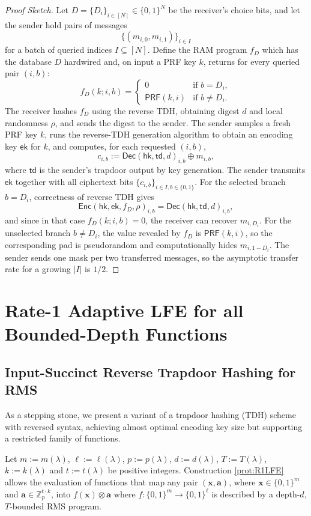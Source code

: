 \documentclass{article}
\newcommand{\Z}{\mathbb{Z}}
\renewcommand{\sec}{\ensuremath{\lambda}}
\newcommand{\algofont}[1]{\ensuremath{\mathsf{#1}}}
\newcommand{\Enc}{{\algofont{Enc}}}
\newcommand{\Dec}{{\algofont{Dec}}}
\begin{document}
{\begin{proof}[Proof Sketch]
Let $D=\{D_i\}_{i\in[N]} \in \{0,1\}^N$ be the receiver's choice bits, and let the
sender hold pairs of messages
\[
\{(m_{i,0},m_{i,1})\}_{i\in I}
\]
for a batch of queried indices $I \subseteq [N]$. Define the RAM program $f_D$ which has the database $D$ hardwired and, on input a PRF key $k$, returns for every queried pair $(i,b)$:
\[
f_D(k;i,b)=
\begin{cases}
0 & \text{if } b = D_i,\\
\mathsf{PRF}(k,i) & \text{if } b \neq D_i.
\end{cases}
\]
The receiver hashes $f_D$ using the reverse TDH, obtaining digest $d$ and local
randomness $\rho$, and sends the digest to the sender. The sender samples a fresh PRF key $k$, runs the reverse-TDH generation algorithm
to obtain an encoding key $\mathsf{ek}$ for $k$, and computes, for each requested
$(i,b)$,
\[
c_{i,b} := \Dec(\mathsf{hk},\mathsf{td},d)_{i,b} \oplus m_{i,b},
\]
where $\mathsf{td}$ is the sender's trapdoor output by key generation.
The sender transmits $\mathsf{ek}$ together with all ciphertext bits
$\{c_{i,b}\}_{i\in I,b\in\{0,1\}}$. For the selected branch $b=D_i$, correctness of reverse TDH gives
\[
\Enc(\mathsf{hk},\mathsf{ek},f_D,\rho)_{i,b}
=
\Dec(\mathsf{hk},\mathsf{td},d)_{i,b},
\]
and since in that case $f_D(k;i,b)=0$, the receiver can recover
$m_{i,D_i}$.
For the unselected branch $b \neq D_i$, the value revealed by $f_D$ is
$\mathsf{PRF}(k,i)$, so the corresponding pad is pseudorandom and computationally hides
$m_{i,1-D_i}$.
The sender sends one mask per two transferred messages, so the asymptotic transfer
rate for a growing $|I|$ is $1/2$.
\end{proof}}
\section{Rate-1 Adaptive LFE for all Bounded-Depth Functions}

\subsection{Input-Succinct Reverse Trapdoor Hashing for RMS}\label{sec:weakTDH}

As a stepping stone, we present a variant of a trapdoor hashing (TDH) scheme \cite{C:DGIMMO19} with reversed syntax, achieving almost optimal encoding key size but supporting a restricted family of functions. 

Let $m:=m(\sec)$, $\ell:=\ell(\sec)$, $p:=p(\sec)$, $d:=d(\sec)$, $T:=T(\sec)$, $k:=k(\sec)$ and $t:=t(\sec)$ be positive integers. Construction \ref{prot:R1LFE} allows the evaluation of functions that map any pair $(\mathbf{x}, \mathbf{a})$, where $\mathbf{x}\in\{0, 1\}^m$ and $\mathbf{a}\in\Z_p^{t\cdot k}$, into $f(\mathbf{x})\otimes \mathbf{a}$ where $f:\{0, 1\}^m\rightarrow \{0, 1\}^\ell$ is described by a depth-$d$, $T$-bounded RMS program. 
\end{document}
